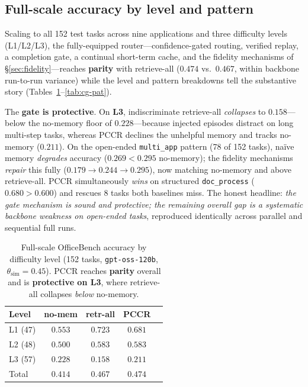 \documentclass[10pt,twocolumn]{article}
\newcommand{\code}[1]{\texttt{\small #1}}
\begin{document}
\subsection{Full-scale accuracy by level and pattern}\label{sec:full}
Scaling to all 152 test tasks across nine applications and three difficulty levels (L1/L2/L3), the
fully-equipped router---confidence-gated routing, verified replay, a completion gate, a continual
short-term cache, and the fidelity mechanisms of \S\ref{sec:fidelity}---reaches
\textbf{parity} with retrieve-all ($0.474$ vs.\ $0.467$, within backbone run-to-run variance) while
the level and pattern breakdowns tell the substantive story (Tables~\ref{tab:cg-level}--\ref{tab:cg-pat}).

The \textbf{gate is protective}. On \textbf{L3}, indiscriminate retrieve-all \emph{collapses} to
$0.158$---below the no-memory floor of $0.228$---because injected episodes distract on long multi-step
tasks, whereas PCCR declines the unhelpful memory and tracks no-memory ($0.211$). On the
open-ended \code{multi\_app} pattern (78 of 152 tasks), na\"ive memory \emph{degrades} accuracy
($0.269 < 0.295$ no-memory); the fidelity mechanisms \emph{repair} this fully
($0.179{\to}0.244{\to}\mathbf{0.295}$), now matching no-memory and above retrieve-all. PCCR
simultaneously \emph{wins} on structured \code{doc\_process} ($0.680 > 0.600$) and rescues 8 tasks
both baselines miss. The honest headline: \emph{the gate mechanism is sound and protective; the
remaining overall gap is a systematic backbone weakness on open-ended tasks}, reproduced identically
across parallel and sequential full runs.

\begin{table}[t]
\centering\small
\setlength{\tabcolsep}{4pt}
\begin{tabular}{@{}lcccc@{}}
\toprule
Level & no-mem & retr-all & \textbf{PCCR} \\
\midrule
L1 (47) & $0.553$ & $\mathbf{0.723}$ & $0.681$ \\
L2 (48) & $0.500$ & $0.583$ & $\mathbf{0.583}$ \\
L3 (57) & $\mathbf{0.228}$ & $0.158$ & $0.211$ \\
\midrule
Total   & $0.414$ & $0.467$ & $\mathbf{0.474}$ \\
\bottomrule
\end{tabular}
\caption{Full-scale OfficeBench accuracy by difficulty level (152 tasks, \code{gpt-oss-120b},
$\theta_{\text{sim}}{=}0.45$). PCCR reaches \textbf{parity} overall and is \textbf{protective on L3},
where retrieve-all collapses \emph{below} no-memory.}
\label{tab:cg-level}
\end{table}
\end{document}
